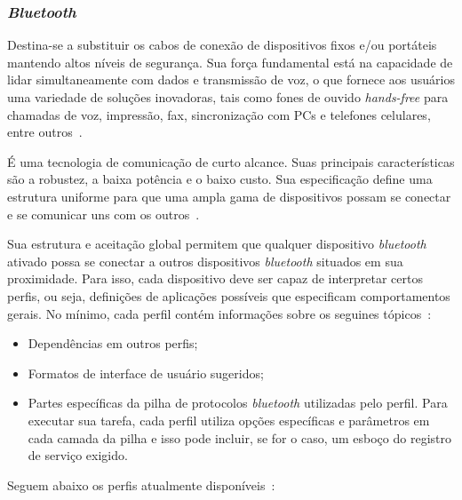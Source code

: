 \subsubsection{\emph{Bluetooth}}

Destina-se a substituir os cabos de conexão de dispositivos fixos e/ou portáteis mantendo altos níveis de segurança. Sua força fundamental está na capacidade de lidar simultaneamente com dados e transmissão de voz, o que fornece aos usuários uma variedade de soluções inovadoras, tais como fones de ouvido \emph{hands-free} para chamadas de voz, impressão, fax, sincronização com PCs e telefones celulares, entre outros~\cite{bluetoothoverview}.

É uma tecnologia de comunicação de curto alcance. Suas principais características são a robustez, a baixa potência e o baixo custo. Sua especificação define uma estrutura uniforme para que uma ampla gama de dispositivos possam se conectar e se comunicar uns com os outros~\cite{bluetoothoverview}.

Sua estrutura e aceitação global permitem que qualquer dispositivo \emph{bluetooth} ativado possa se conectar a outros dispositivos \emph{bluetooth} situados em sua proximidade. Para isso, cada dispositivo deve ser capaz de interpretar certos perfis, ou seja, definições de aplicações possíveis que especificam comportamentos gerais. No mínimo, cada perfil contém informações sobre os seguines tópicos~\cite{bluetoothprofiles}:

\begin{itemize}
	\item Dependências em outros perfis;
	\item Formatos de interface de usuário sugeridos;
	\item Partes específicas da pilha de protocolos \emph{bluetooth} utilizadas pelo perfil. Para executar sua tarefa, cada perfil utiliza opções específicas e parâmetros em cada camada da pilha e isso pode incluir, se for o caso, um esboço do registro de serviço exigido.
\end{itemize}

Seguem abaixo os perfis atualmente disponíveis~\cite{bluetoothprofiles}:

